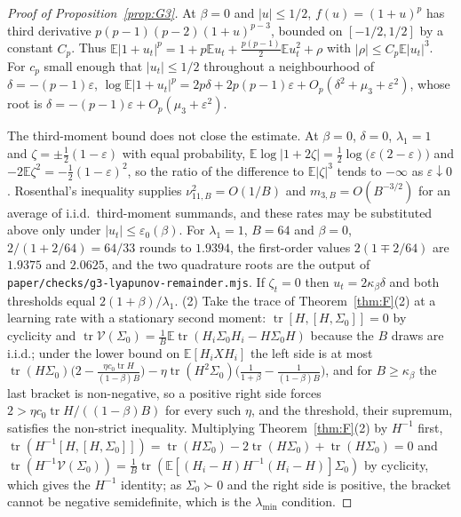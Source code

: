 \documentclass[11pt]{article}
\theoremstyle{remark}
\newcommand{\E}{\mathbb{E}}
\newcommand{\tr}{\operatorname{tr}}
\begin{document}
\begin{proof}[Proof of Proposition~\ref{prop:G3}]
At $\beta=0$ and $|u|\le1/2$, $f(u)=(1+u)^p$ has third derivative $p(p-1)(p-2)(1+u)^{p-3}$, bounded on $[-1/2,1/2]$ by a constant $C_p$. Thus $\E|1+u_t|^p=1+p\E u_t+\frac{p(p-1)}2\E u_t^2+\rho$ with $|\rho|\le C_p\E|u_t|^3$. For $c_p$ small enough that $|u_t|\le1/2$ throughout a neighbourhood of $\delta=-(p-1)\varepsilon$, $\log\E|1+u_t|^p=2p\delta+2p(p-1)\varepsilon+O_p(\delta^2+\mu_3+\varepsilon^2)$, whose root is $\delta=-(p-1)\varepsilon+O_p(\mu_3+\varepsilon^2)$.

The third-moment bound does not close the estimate. At $\beta=0$, $\delta=0$, $\lambda_1=1$ and $\zeta=\pm\frac12(1-\varepsilon)$ with equal probability, $\E\log|1+2\zeta|=\frac12\log\big(\varepsilon(2-\varepsilon)\big)$ and $-2\E\zeta^2=-\frac12(1-\varepsilon)^2$, so the ratio of the difference to $\E|\zeta|^3$ tends to $-\infty$ as $\varepsilon\downarrow0$. Rosenthal's inequality supplies $\nu_{11,B}^2=O(1/B)$ and $m_{3,B}=O(B^{-3/2})$ for an average of i.i.d.\ third-moment summands, and these rates may be substituted above only under $|u_t|\le\varepsilon_0(\beta)$. For $\lambda_1=1$, $B=64$ and $\beta=0$, $2/(1+2/64)=64/33$ rounds to $1.9394$, the first-order values $2(1\mp2/64)$ are $1.9375$ and $2.0625$, and the two quadrature roots are the output of \texttt{paper/checks/g3-lyapunov-remainder.mjs}. If $\zeta_t=0$ then $u_t=2\kappa_\beta\delta$ and both thresholds equal $2(1+\beta)/\lambda_1$. (2) Take the trace of Theorem~\ref{thm:F}(2) at a learning rate with a stationary second moment: $\tr[H,[H,\Sigma_0]]=0$ by cyclicity and $\tr\mathcal V(\Sigma_0)=\frac1B\E\tr(H_i\Sigma_0H_i-H\Sigma_0H)$ because the $B$ draws are i.i.d.; under the lower bound on $\E[H_iXH_i]$ the left side is at most $\tr(H\Sigma_0)\big(2-\frac{\eta c_0\tr H}{(1-\beta)B}\big)-\eta\tr(H^2\Sigma_0)\big(\frac1{1+\beta}-\frac1{(1-\beta)B}\big)$, and for $B\ge\kappa_\beta$ the last bracket is non-negative, so a positive right side forces $2>\eta c_0\tr H/((1-\beta)B)$ for every such $\eta$, and the threshold, their supremum, satisfies the non-strict inequality. Multiplying Theorem~\ref{thm:F}(2) by $H^{-1}$ first, $\tr(H^{-1}[H,[H,\Sigma_0]])=\tr(H\Sigma_0)-2\tr(H\Sigma_0)+\tr(H\Sigma_0)=0$ and $\tr(H^{-1}\mathcal V(\Sigma_0))=\frac1B\tr(\E[(H_i-H)H^{-1}(H_i-H)]\Sigma_0)$ by cyclicity, which gives the $H^{-1}$ identity; as $\Sigma_0\succ0$ and the right side is positive, the bracket cannot be negative semidefinite, which is the $\lambda_{\min}$ condition.
\end{proof}
\end{document}
